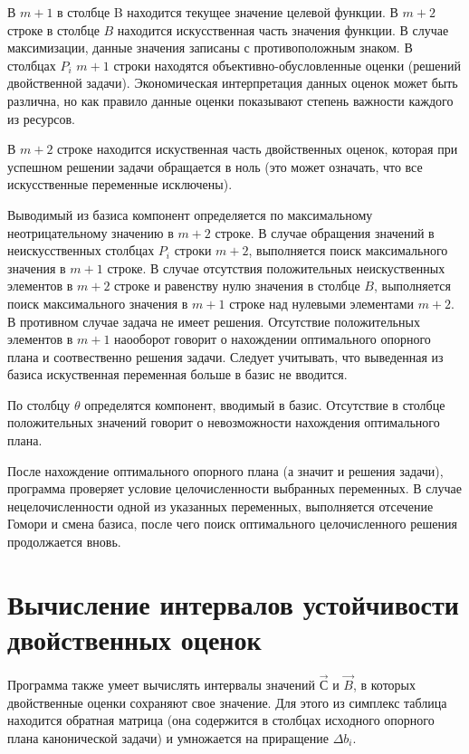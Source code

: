 \documentclass[pdftex, unicode, a4paper,12pt,oneside,utf8x, usehyperref]{report-gost}
\begin{document}
В $m+1$ в столбце B находится текущее значение целевой функции. В $m+2$ строке в столбце $B$ находится искусственная часть значения функции. В случае максимизации, данные значения записаны с противоположным знаком. В столбцах $P_i$ $m+1$ строки находятся объективно-обусловленные оценки (решений двойственной задачи). Экономическая интерпретация данных оценок может быть различна, но как правило данные оценки показывают степень важности каждого из ресурсов.

В $m+2$ строке находится искуственная часть двойственных оценок, которая при успешном решении задачи обращается в ноль (это может означать, что все искусственные переменные исключены).

Выводимый из базиса компонент определяется по максимальному неотрицательному значению в $m+2$ строке.
В случае обращения значений в неискусственных столбцах $P_i$ строки $m+2$, выполняется поиск максимального значения в $m+1$ строке. В случае отсутствия положительных неискуственных элементов в $m+2$ строке и равенству нулю значения в столбце $B$, выполняется поиск максимального значения в $m+1$ строке над нулевыми элементами $m+2$. В противном случае задача не имеет решения. Отсутствие положительных элементов в $m+1$ наооборот говорит о нахождении оптимального опорного плана и соотвественно решения задачи. Следует учитывать, что выведенная из базиса искуственная переменная больше в базис не вводится.

По столбцу $\theta$ определятся компонент, вводимый в базис. Отсутствие в столбце положительных значений говорит о невозможности нахождения оптимального плана.

После нахождение оптимального опорного плана (а значит и решения задачи), программа проверяет условие целочисленности выбранных переменных. В случае нецелочисленности одной из указанных переменных, выполняется отсечение Гомори и смена базиса, после чего поиск оптимального целочисленного решения продолжается вновь.

\section{Вычисление интервалов устойчивости двойственных оценок}
Программа также умеет вычислять интервалы значений $\vec{С}$ и $\vec{B}$, в которых двойственные оценки сохраняют свое значение. Для этого из симплекс таблица находится обратная матрица (она содержится в столбцах исходного опорного плана канонической задачи) и умножается на приращение $\Delta b_i$.
\end{document}
